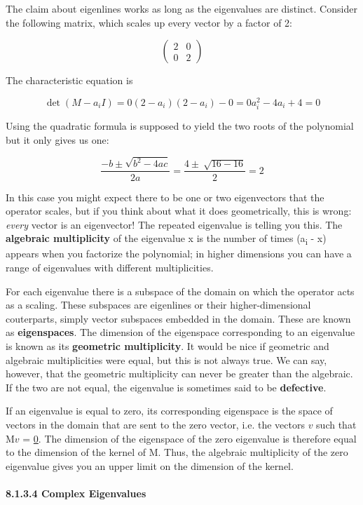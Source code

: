 \documentclass[oneside,english]{amsbook}
\numberwithin{section}{chapter}
\theoremstyle{plain}
\theoremstyle{definition}
\begin{document}
The claim about eigenlines works as long as the eigenvalues are
distinct. Consider the following matrix, which scales up every vector by
a factor of 2:

\[\begin{pmatrix}
	2 & 0 \\
	0 & 2
\end{pmatrix}\]

The characteristic equation is

\[{\det\left( M - a_{i}I \right) = 0
}{\left( 2 - a_{i} \right)\left( 2 - a_{i} \right) - 0 = 0
}{a_{i}^{2} - 4a_{i} + 4 = 0}\]

Using the quadratic formula is supposed to yield the two roots of the
polynomial but it only gives us one:

\[\frac{- b \pm \sqrt{b^{2} - 4ac}}{2a} = \frac{4 \pm \ \sqrt{16 - 16}}{2} = 2\]

In this case you might expect there to be one or two eigenvectors that
the operator scales, but if you think about what it does geometrically,
this is wrong: \emph{every} vector is an eigenvector! The repeated
eigenvalue is telling you this. The \textbf{algebraic multiplicity} of
the eigenvalue x is the number of times (a\textsubscript{i} - x) appears
when you factorize the polynomial; in higher dimensions you can have a
range of eigenvalues with different multiplicities.

For each eigenvalue there is a subspace of the domain on which the
operator acts as a scaling. These subspaces are eigenlines or their
higher-dimensional couterparts, simply vector subspaces embedded in the
domain. These are known as \textbf{eigenspaces}. The dimension of the
eigenspace corresponding to an eigenvalue is known as its
\textbf{geometric multiplicity}. It would be nice if geometric and
algebraic multiplicities were equal, but this is not always true. We can
say, however, that the geometric multiplicity can never be greater than
the algebraic. If the two are not equal, the eigenvalue is sometimes
said to be \textbf{defective}.

If an eigenvalue is equal to zero, its corresponding eigenspace is the
space of vectors in the domain that are sent to the zero vector, i.e.
the vectors $v$ such that M$v$ = \ul{0}. The dimension of the
eigenspace of the zero eigenvalue is therefore equal to the dimension of
the kernel of M. Thus, the algebraic multiplicity of the zero eigenvalue
gives you an upper limit on the dimension of the kernel.

\paragraph{8.1.3.4 Complex Eigenvalues}\label{complex-eigenvalues}
\end{document}
